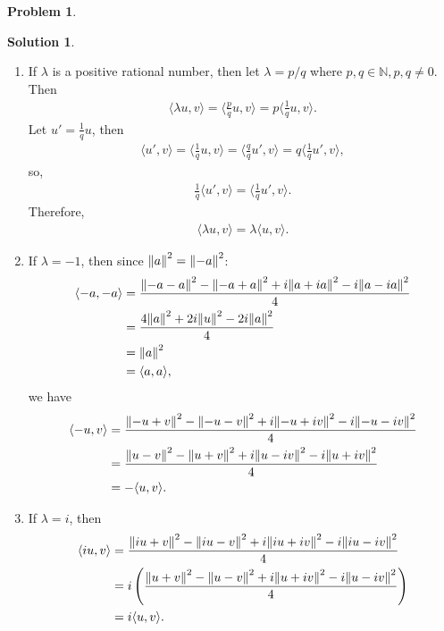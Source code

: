 \documentclass{book}
\theoremstyle{definition}
\newtheorem*{prob*}{Problem}
\newtheorem*{sln*}{Solution}
\newcommand{\la}{\langle}
\newcommand{\ra}{\rangle}
\begin{document}
\begin{prob*}
\begin{enumerate}
\begin{sln*}
\begin{enumerate}
\begin{enumerate}
					\item If $\lambda$ is a positive rational number, then let $\lambda = p/q$ where $p,q \in \mathbb{N}, p,q\neq 0$. Then
					\begin{align*}
					\la \lambda u,v \ra = \bigg\la \frac{p}{q}u,v \bigg\ra = p\bigg\la \frac{1}{q}u,v \bigg\ra.
					\end{align*}
					Let $u' = \frac{1}{q}u$, then
					\begin{align*}
					\bigg\la u',v\bigg\ra = \bigg\la \frac{1}{q}u,v \bigg\ra = \bigg\la \frac{q}{q} u',v\bigg\ra = q  \bigg\la \frac{1}{q}u',v \bigg\ra,
					\end{align*}
					so,
					\begin{align*}
					\frac{1}{q}\bigg\la u',v\bigg\ra = \bigg\la \frac{1}{q}u',v \bigg\ra.
					\end{align*}
					Therefore,
					\begin{align*}
					\la \lambda u,v \ra = \lambda \la u,v\ra.
					\end{align*}
					
					\item If $\lambda = -1$, then since $\norm{a}^2 = \norm{-a}^2$:
					\begin{align*}
					\la -a,-a\ra 
					&= \frac{\norm{-a-a}^2 - \norm{-a+a}^2 +i\norm{a+ia}^2 - i\norm{a-ia}^2}{4}\\
					&= \frac{4\norm{a}^2 + 2i\norm{u}^2 - 2i\norm{a}^2}{4}\\
					&= \norm{a}^2\\
					&= \la a,a\ra,
					\end{align*}
					we have
					\begin{align*}
					\la -u,v\ra &= \frac{\norm{-u+v}^2 - \norm{-u-v}^2 +i\norm{-u+iv}^2 - i\norm{-u-iv}^2}{4}\\
					&= \frac{\norm{u-v}^2 - \norm{u+v}^2 +i\norm{u-iv}^2 - i\norm{u+iv}^2}{4}\\
					&= - \la u,v \ra.
					\end{align*}
					\item If $\lambda = i$, then
					\begin{align*}
					\la iu,v \ra 
					&= \frac{\norm{iu+v}^2 - \norm{iu-v}^2 +i\norm{iu+iv}^2 - i\norm{iu-iv}^2}{4}\\
					&= i \left(\frac{\norm{u+v}^2 - \norm{u-v}^2 +i\norm{u+iv}^2 - i\norm{u-iv}^2}{4}\right)\\
					&= i\la u,v\ra.
					\end{align*}
					

\end{enumerate}
\end{enumerate}
\end{sln*}
\end{enumerate}
\end{prob*}
\end{document}
